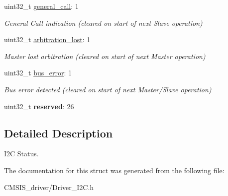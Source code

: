 \begin{DoxyCompactItemize}
uint32\+\_\+t \mbox{\hyperlink{struct___a_r_m___i2_c___s_t_a_t_u_s_ab65804439f6f5beda8da30381b0ad22d}{general\+\_\+call}}\+: 1
\begin{DoxyCompactList}\small\item\em General Call indication (cleared on start of next Slave operation) \end{DoxyCompactList}\item 
\mbox{\label{struct___a_r_m___i2_c___s_t_a_t_u_s_ab3e3c8eeeae7fbe3c51dcb3d4104af24}} 
uint32\+\_\+t \mbox{\hyperlink{struct___a_r_m___i2_c___s_t_a_t_u_s_ab3e3c8eeeae7fbe3c51dcb3d4104af24}{arbitration\+\_\+lost}}\+: 1
\begin{DoxyCompactList}\small\item\em Master lost arbitration (cleared on start of next Master operation) \end{DoxyCompactList}\item 
\mbox{\label{struct___a_r_m___i2_c___s_t_a_t_u_s_a43b1d210c48f4361c5054ba69bcae702}} 
uint32\+\_\+t \mbox{\hyperlink{struct___a_r_m___i2_c___s_t_a_t_u_s_a43b1d210c48f4361c5054ba69bcae702}{bus\+\_\+error}}\+: 1
\begin{DoxyCompactList}\small\item\em Bus error detected (cleared on start of next Master/\+Slave operation) \end{DoxyCompactList}\item 
\mbox{\label{struct___a_r_m___i2_c___s_t_a_t_u_s_aa43c4c21b173ada1b6b7568956f0d650}} 
uint32\+\_\+t {\bfseries reserved}\+: 26
\end{DoxyCompactItemize}


\subsection{Detailed Description}
I2C Status. 

The documentation for this struct was generated from the following file\+:\begin{DoxyCompactItemize}
\item 
C\+M\+S\+I\+S\+\_\+driver/Driver\+\_\+\+I2\+C.\+h\end{DoxyCompactItemize}
